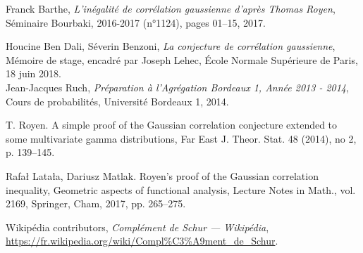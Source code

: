 \documentclass[12pt]{article}
\begin{document}
\begin{thebibliography}{9}

Franck Barthe,
\textit{L’inégalité de corrélation gaussienne d’après Thomas Royen},
Séminaire Bourbaki, 2016-2017 (n°1124), pages 01--15, 2017.

Houcine Ben Dali, Séverin Benzoni,
\textit{La conjecture de corrélation gaussienne},
Mémoire de stage, encadré par Joseph Lehec, École Normale Supérieure de Paris, 18 juin 2018.\\

Jean-Jacques Ruch,
\textit{Préparation à l’Agrégation Bordeaux 1, Année 2013 - 2014},
Cours de probabilités, Université Bordeaux 1, 2014.

T. Royen. A simple proof of the Gaussian correlation conjecture extended to some
multivariate gamma distributions, Far East J. Theor. Stat. 48 (2014), no 2,
p. 139–145.

Rafał Latała, Dariusz Matlak.
Royen’s proof of the Gaussian correlation inequality,
Geometric aspects of functional analysis, Lecture Notes in Math., vol. 2169, Springer, Cham,
2017, pp. 265–275.

Wikipédia contributors, \emph{Complément de Schur --- Wikipédia}, \\
\url{https://fr.wikipedia.org/wiki/Compl%C3%A9ment_de_Schur}.
\end{thebibliography}
\end{document}
